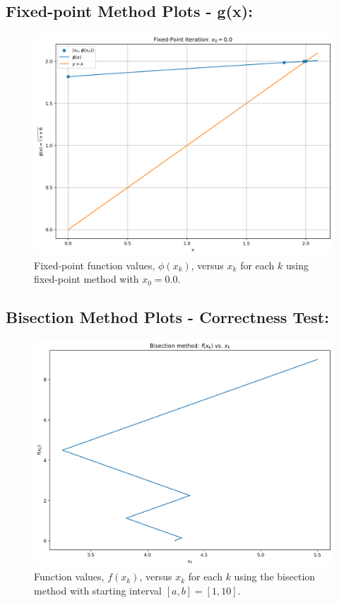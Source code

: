\documentclass[11pt]{article}
\begin{document}
\subsection{Fixed-point Method Plots - g(x):}

\begin{figure}[H]
	\centering
	\includegraphics[width=\linewidth]{../figures/Fixed_g}
	\caption{Fixed-point function values, $\phi(x_k)$, versus $x_k$ for each $k$ using fixed-point method with $x_0 = 0.0$.}
	\label{fig:fixed_g_0.0}
\end{figure}


\subsection{Bisection Method Plots - Correctness Test:}
\begin{figure}[H]
	\centering
	\includegraphics[width=\linewidth]{../figures/Bisection_Test}
	\caption{Function values, $f(x_k)$, versus $x_k$ for each $k$ using the bisection method with starting interval $[a,b]= [1,10]$.}
	\label{fig:bisec_test}
\end{figure}
\end{document}
